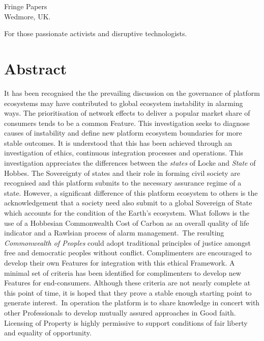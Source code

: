 \documentclass[11pt, oneside]{article}   	%
\begin{document}
\maketitle
\vfill
\begin{center}
Fringe Papers\\
Wedmore, UK.
\end{center}

\newpage
\thispagestyle{empty}
\mbox{}
\newpage

\vspace*{50mm}
\begin{center}
For those passionate activists and disruptive technologists.
\end{center}

\newpage
\thispagestyle{empty}
\mbox{}
\newpage

\section*{Abstract}
It has been recognised the the prevailing discussion on the governance of platform ecosystems may have contributed to global ecosystem instability in alarming ways.
The prioritisation of network effects to deliver a popular market share of consumers tends to be a common Feature.
This investigation seeks to diagnose causes of instability and define new platform ecosystem boundaries for more stable outcomes.
It is understood that this has been achieved through an investigation of ethics, continuous integration processes and operations.
This investigation appreciates the differences between the \emph{states} of Locke and \emph{State} of Hobbes.
The Sovereignty of states and their role in forming civil society are recognised and this platform submits to the necessary assurance regime of a state.
However, a significant difference of this platform ecosystem to others is the acknowledgement that a society need also submit to a global Sovereign of State which accounts for the condition of the Earth's ecosystem.
What follows is the use of a Hobbesian Commonwealth Cost of Carbon as an overall quality of life indicator and a Rawlsian process of alarm management.\
The resulting \emph{Commonwealth of Peoples} could adopt traditional principles of justice amongst free and democratic peoples without conflict.
Complimenters are encouraged to develop their own Features for integration with this ethical Framework.
A minimal set of criteria has been identified for complimenters to develop new Features for end-consumers.
Although these criteria are not nearly complete at this point of time, it is hoped that they prove a stable enough starting point to generate interest.\
In operation the platform is to share knowledge in concert with other Professionals to develop mutually assured approaches in Good faith.
Licensing of Property is highly permissive to support conditions of fair liberty and equality of opportunity.
\end{document}
